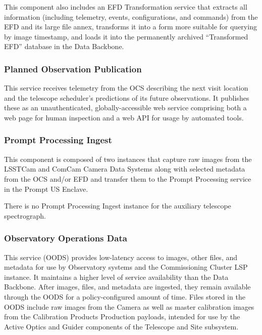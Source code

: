 \documentclass[DM,toc,lsstdraft]{lsstdoc}
\begin{document}
This component also includes an EFD Transformation service that extracts
all information (including telemetry, events, configurations, and
commands) from the EFD and its large file annex, transforms it into a
form more suitable for querying by image timestamp, and loads it into
the permanently archived ``Transformed EFD'' database in the Data
Backbone.

\subsubsection{Planned Observation Publication}\label{planned-observation-publication}

This service receives telemetry from the OCS describing the next visit location and the telescope scheduler's predictions of its future observations.
It publishes these as an unauthenticated, globally-accessible web service comprising both a web page for human inspection and a web API for usage by automated tools.

\subsubsection{Prompt Processing Ingest}\label{prompt-processing-ingest}

This component is composed of two instances that capture
raw images from the LSSTCam and ComCam Camera Data
Systems along with selected metadata from the OCS and/or EFD and
transfer them to the Prompt Processing service in the Prompt US Enclave.

There is no Prompt Processing Ingest instance for the auxiliary
telescope spectrograph.

\subsubsection{Observatory Operations Data}\label{obs-ops-data}

This service (OODS) provides low-latency access to images, other files, and metadata for use by Observatory systems and the Commissioning Cluster LSP instance.
It maintains a higher level of service availability than the Data Backbone.
After images, files, and metadata are ingested, they remain available through the OODS for a policy-configured amount of time.
Files stored in the OODS include raw images from the Camera as well as master calibration images from the Calibration Products Production payloads, intended for use by the Active Optics and Guider components of the Telescope and Site subsystem.
\end{document}
